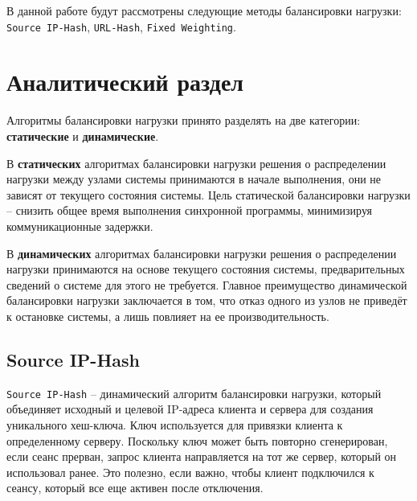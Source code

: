 
В данной работе будут рассмотрены следующие методы балансировки нагрузки:
\texttt{Source IP-Hash}, \texttt{URL-Hash}, \texttt{Fixed Weighting}.

\section{Аналитический раздел}

Алгоритмы балансировки нагрузки принято разделять на две категории: \textbf{статические} и \textbf{динамические}.


В \textbf{статических} алгоритмах балансировки нагрузки решения о распределении нагрузки между узлами системы принимаются в начале выполнения, они не зависят от текущего состояния системы. Цель статической балансировки нагрузки -- снизить общее время выполнения синхронной программы, минимизируя коммуникационные задержки. \cite{lbiccar}

В \textbf{динамических} алгоритмах балансировки нагрузки решения о распределении нагрузки принимаются на основе текущего состояния системы, предварительных сведений о системе для этого не требуется. Главное преимущество динамической балансировки нагрузки заключается в том, что отказ одного из узлов не приведёт к остановке системы, а лишь повлияет на ее производительность. \cite{lbiccar}

\subsection{{Source IP-Hash}}

\texttt{Source IP-Hash} -- динамический алгоритм балансировки нагрузки, который объединяет исходный и целевой IP-адреса клиента и сервера для создания уникального хеш-ключа. Ключ используется для привязки клиента к определенному серверу. Поскольку ключ может быть повторно сгенерирован, если сеанс прерван, запрос клиента направляется на тот же сервер, который он использовал ранее. Это полезно, если важно, чтобы клиент подключился к сеансу, который все еще активен после отключения. \cite{sdn5g}

